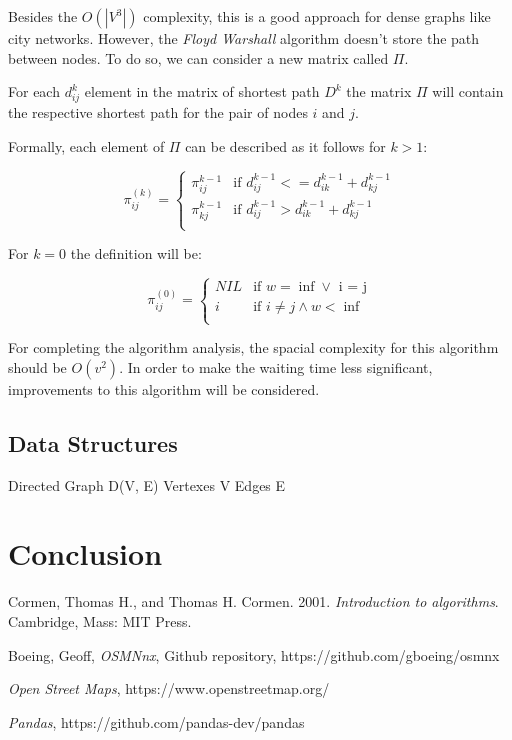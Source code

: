 \documentclass{article}
\begin{document}
    Besides the $O(|V^3|)$ complexity, this is a good approach for dense graphs like city networks.
    However, the \textit{Floyd Warshall} algorithm doesn't store the path between nodes. To do so, we can consider a new matrix called $\Pi$. \par
    For each $d_{ij}^{k}$ element in the matrix of shortest path $D^k$ the matrix $\Pi$ will contain the respective shortest path for the pair of nodes $i$ and $j$. \par
    Formally, each element of $\Pi$ can be described as it follows for $k>1$: 
    
    \begin{equation} 
      \pi_{ij}^{(k)} =
        \begin{cases}
          \pi_{ij}^{k-1} & \text{if } d_{ij}^{k-1} <= d_{ik}^{k-1} + d_{kj}^{k-1} \\
          \pi_{kj}^{k-1} & \text{if } d_{ij}^{k-1} > d_{ik}^{k-1} + d_{kj}^{k-1}\\
        \end{cases}       
    \end{equation}
    
    For $k = 0$ the definition will be: 
    
    \begin{equation} 
      \pi_{ij}^{(0)} =
        \begin{cases}
          NIL & \text{if } w = \inf \vee \text{ i = j}\\
          i & \text{if } i \neq j \wedge w < \inf\\
        \end{cases}      
    \end{equation}
    
    For completing the algorithm analysis, the spacial complexity for this algorithm should be $O(v^2)$. \newline 
    In order to make the waiting time less significant, improvements to this algorithm will be considered. 

\subsection*{Data Structures}

Directed Graph D(V, E)
Vertexes V
Edges E

\section*{Conclusion} 

\begin{thebibliography}{9}

Cormen, Thomas H., and Thomas H. Cormen. 2001. \textit{Introduction to algorithms}. Cambridge, Mass: MIT Press.

Boeing, Geoff, \textit{OSMNnx}, Github repository, https://github.com/gboeing/osmnx

\textit{Open Street Maps}, https://www.openstreetmap.org/

\textit{Pandas}, https://github.com/pandas-dev/pandas

\end{thebibliography}
\end{document}
